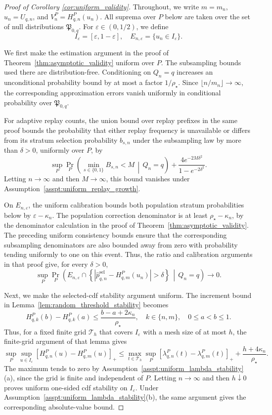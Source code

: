 \documentclass[10pt]{article}
\begin{document}
\begin{proof}[Proof of Corollary \ref{cor:uniform_validity}]
Throughout, we write $m=m_n$, $u_n=U_{q,n}$, and $V_n^P=H^P_{q,n}(u_n)$. All suprema over $P$ below are taken over the set of null distributions $\mathfrak P_{0,q}$. For $\varepsilon\in(0,1/2)$, we define
\[
I_\varepsilon=[\varepsilon,1-\varepsilon],
\quad
E_{n,\varepsilon}=\{u_n\in I_\varepsilon\}.
\]

We first make the estimation argument in the proof of Theorem~\ref{thm:asymptotic_validity} uniform over $P$. The subsampling bounds used there are distribution-free. Conditioning on $Q_n=q$ increases an unconditional probability bound by at most a factor $1/\rho_\star$. Since $\lfloor n/m_n\rfloor\to\infty$, the corresponding approximation errors vanish uniformly in conditional probability over $\mathfrak P_{0,q}$.

For adaptive replay counts, the union bound over replay prefixes in the same proof bounds the probability that either replay frequency is unavailable or differs from its stratum selection probability $b_{s,n}$ under the subsampling law by more than $\delta>0$, uniformly over $P$, by
\[
\sup_P\Pr_P\!\left(
\min_{s\in\{0,1\}}B_{s,n}<M
\,\middle|\,Q_n=q
\right)
+\frac{4e^{-2M\delta^2}}{1-e^{-2\delta^2}}.
\]
Letting $n\to\infty$ and then $M\to\infty$, this bound vanishes under Assumption~\ref{asspt:uniform_replay_growth}.

On $E_{n,\varepsilon}$, the uniform calibration bounds both population stratum probabilities below by $\varepsilon-\kappa_n$. The population correction denominator is at least $\rho_\star-\kappa_n$, by the denominator calculation in the proof of Theorem~\ref{thm:asymptotic_validity}. The preceding uniform consistency bounds ensure that the corresponding subsampling denominators are also bounded away from zero with probability tending uniformly to one on this event. Thus, the ratio and calibration arguments in that proof give, for every $\delta>0$,
\[
\sup_P\Pr_P\!\left(
E_{n,\varepsilon}\cap
\left\{
\left|\widehat p^{\mathrm{sel}}_{q,n}
-H^P_{q,m}(u_n)\right|>\delta
\right\}
\,\middle|\,Q_n=q
\right)\to0.
\]

Next, we make the selected-cdf stability argument uniform. The increment bound in Lemma~\ref{lem:random_threshold_stability} becomes
\[
H^P_{q,k}(b)-H^P_{q,k}(a)
\le\frac{b-a+2\kappa_n}{\rho_\star},
\quad k\in\{n,m\},\quad 0\le a<b\le1.
\]
Thus, for a fixed finite grid $\mathcal T_h$ that covers $I_\varepsilon$ with a mesh size of at most $h$, the finite-grid argument of that lemma gives
\[
\sup_P\sup_{u\in I_\varepsilon}
[H^P_{q,n}(u)-H^P_{q,m}(u)]_+
\le
\max_{t\in\mathcal T_h}
\sup_P[\lambda^P_{q,n}(t)-\lambda^P_{q,m}(t)]_+
+\frac{h+4\kappa_n}{\rho_\star}.
\]
The maximum tends to zero by Assumption~\ref{asspt:uniform_lambda_stability}(a), since the grid is finite and independent of $P$. Letting $n\to\infty$ and then $h\downarrow0$ proves uniform one-sided cdf stability on $I_\varepsilon$. Under Assumption~\ref{asspt:uniform_lambda_stability}(b), the same argument gives the corresponding absolute-value bound.


\end{proof}
\end{document}
